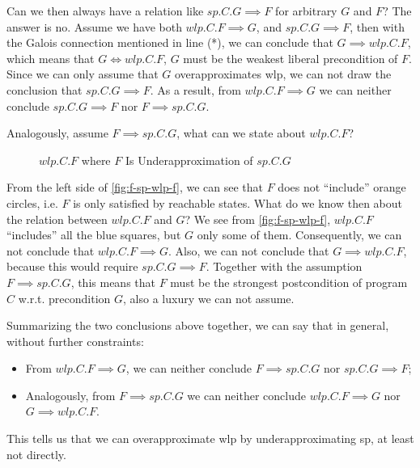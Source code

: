 Can we then always have a relation like $sp.C.G\implies F$ for arbitrary $G$ and $F$? 
The answer is no. Assume we have both $wlp.C.F\implies G$, and $sp.C.G\implies F$, then with the Galois connection mentioned in line (*), we can conclude that $G\implies wlp.C.F$, which means that $G\Leftrightarrow wlp.C.F$, $G$ must be  the weakest liberal precondition of $F$. 
Since we can only assume that $G$ overapproximates wlp, we can not draw the conclusion that $sp.C.G\implies F$. 
As a result, from $wlp.C.F\implies G$ we can neither conclude $sp.C.G\implies F$ nor $F\implies sp.C.G$. 

Analogously, assume $F\implies sp.C.G$, what can we state about $wlp.C.F$?
\begin{figure}[ht]
	\centering
	
	\caption{$wlp.C.F$ where $F$ Is Underapproximation of $sp.C.G$}
	\label{fig:f-sp-wlp-f}
\end{figure}
From the left side of \autoref{fig:f-sp-wlp-f}, we can see that $F$ does not ``include'' orange circles, i.e. $F$ is only satisfied by reachable states. 
What do we know then about the relation between $wlp.C.F$ and $G$? 
We see from \autoref{fig:f-sp-wlp-f}, $wlp.C.F$ ``includes'' all the blue squares, but $G$ only some of them. 
Consequently, we can not conclude that $wlp.C.F\implies G$. 
Also, we can not conclude that $G\implies wlp.C.F$, because this would require $sp.C.G\implies F$. 
Together with the assumption $F\implies sp.C.G$, this means that $F$ must be  the strongest postcondition of program $C$ w.r.t. precondition $G$, also a luxury we can not assume. 

Summarizing the two conclusions above together, we can say that in general, without further constraints: 
\begin{itemize}
	\item From $wlp.C.F\implies G$, we can neither conclude $F\implies sp.C.G$ nor $sp.C.G\implies F$;
	\item Analogously, from $F\implies sp.C.G$ we can neither conclude $wlp.C.F\implies G$ nor $G\implies wlp.C.F$. 
\end{itemize}
This tells us that we can  overapproximate wlp by underapproximating sp, at least not directly. 




